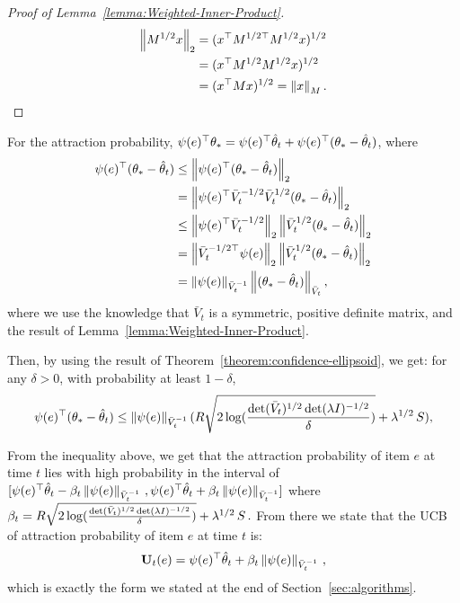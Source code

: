 \begin{proof}[Proof of Lemma~\ref{lemma:Weighted-Inner-Product}]
\begin{align*}
\left\|M^{1/2} x\right\|_2
&= (x^\top {M^{1/2 \top}} M^{1/2} x)^{1/2}  \\
&= (x^\top {M^{1/2}} M^{1/2} x)^{1/2} \\
&= (x^\top M x)^{1/2} = \left\|x\right\|_M .
\end{align*}
\end{proof}

For the attraction probability, $\psi(e)^\top \mathbf{\theta}_* = \psi(e)^\top \hat{\mathbf{\theta}}_t + \psi(e)^\top (\mathbf{\theta}_* - \hat{\mathbf{\theta}}_t)$, where
\begin{align*}
\psi(e)^\top (\mathbf{\theta}_* - \hat{\mathbf{\theta}}_t)
&\le \left\|\psi(e)^\top (\mathbf{\theta}_* - \hat{\mathbf{\theta}}_t)\right\|_2  \\
&= \left\|\psi(e)^\top {\bar{V}_{t}}^{-1/2} {\bar{V}_{t}}^{1/2} (\mathbf{\theta}_* - \hat{\mathbf{\theta}}_t)\right\|_2 \\
&\le \left\|\psi(e)^\top {\bar{V}_{t}}^{-1/2}\right\|_2 \left\|{\bar{V}_{t}}^{1/2} (\mathbf{\theta}_* - \hat{\mathbf{\theta}}_t)\right\|_2 \\
&= \left\|{{\bar{V}_{t}}^{-1/2 \top}} \psi(e)\right\|_2 \left\|{\bar{V}_{t}}^{1/2} (\mathbf{\theta}_* - \hat{\mathbf{\theta}}_t)\right\|_2 \\
&= \left\| \psi(e)\right\|_{\bar{V}_{t}^{-1}} \left\|(\mathbf{\theta}_* - \hat{\mathbf{\theta}}_t)\right\|_{\bar{V}_{t}} ,
\end{align*}
where we use the knowledge that $\bar{V}_{t}$ is a symmetric, positive definite matrix, and the result of Lemma~\ref{lemma:Weighted-Inner-Product}.

Then, by using the result of Theorem~\ref{theorem:confidence-ellipsoid}, we get:
for any $\delta > 0$, with probability at least $1-\delta$,
\begin{align*}
\psi(e)^\top (\mathbf{\theta}_* - \hat{\mathbf{\theta}}_t) \le
 \left\| \psi(e)\right\|_{\bar{V}_{t}^{-1}} (R \sqrt{2 \log( \frac{\det (\bar{V}_{t})^{1/2}\det(\lambda I)^{-1/2}}{\delta} )} + \lambda^{1/2}\, S) ,
\end{align*}

From the inequality above, we get that the attraction probability of item $e$ at time $t$ lies with high probability in the interval of 
$[\psi(e)^\top \hat{\mathbf{\theta}}_t - \beta_t \left\|\psi(e) \right\|_{\bar{V}_t^{-1}}\, , \psi(e)^\top \hat{\mathbf{\theta}}_t + \beta_t \left\|\psi(e) \right\|_{\bar{V}_t^{-1}}]$ where $\beta_t = R \sqrt{2 \log( \frac{\det (\bar{V}_{t})^{1/2}\det(\lambda I)^{-1/2}}{\delta} )} + \lambda^{1/2}\, S\,.$
From there we state that the UCB of attraction probability of item $e$ at time $t$ is:
\begin{align*}
  \mathbf{U}_t(e) = \psi(e)^\top \hat{\mathbf{\theta}}_t + \beta_t \left\|\psi(e) \right\|_{\bar{V}_t^{-1}}\,,
\end{align*}
which is exactly the form we stated at the end of Section~\ref{sec:algorithms}.

